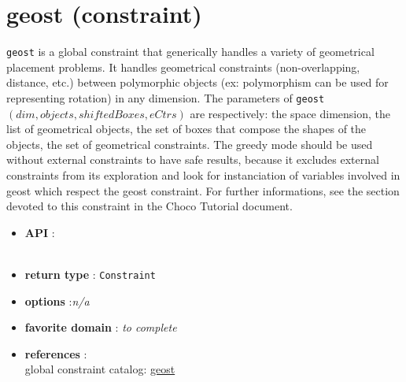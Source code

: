 \label{geost}
\hypertarget{geost}{}

\section{geost (constraint)}\label{geost:geostconstraint}\hypertarget{geost:geostconstraint}{}

\begin{notedef}
\texttt{geost} is a global constraint that generically handles a variety of geometrical placement problems. 
It handles geometrical constraints (non-overlapping, distance, etc.) between polymorphic objects (ex: polymorphism can be used for representing rotation) in any dimension.
The parameters of \texttt{geost}$(dim, objects, shiftedBoxes, eCtrs)$ are respectively:
the space dimension, the list of geometrical objects, the set of boxes that compose the shapes of the objects, the set of geometrical constraints.
The greedy mode should be used without external constraints to have safe results, because it excludes external constraints from its exploration and look for instanciation of variables involved in geost which respect the geost constraint.
For further informations, see the section devoted to this constraint in the Choco Tutorial document. 
\end{notedef}

\begin{itemize}
	\item \textbf{API} :\\
\\
	\item \textbf{return type} : \texttt{Constraint}
	\item \textbf{options} :\emph{n/a}
	\item \textbf{favorite domain} : \emph{to complete}
	\item \textbf{references} :\\
      global constraint catalog: \href{http://www.emn.fr/x-info/sdemasse/gccat/Cgeost.html}{geost}
\end{itemize}

